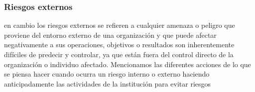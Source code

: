     \subsubsection{Riesgos externos}
     en cambio los riesgos externos se refieren a cualquier amenaza o peligro que proviene del entorno externo de una organización y que puede afectar negativamente a sus operaciones, objetivos o resultados son inherentemente difíciles de predecir y controlar, ya que están fuera del control directo de la organización o individuo afectado.
     Mencionamos las diferentes acciones de lo que se piensa hacer cuando ocurra un riesgo interno o externo haciendo anticipadamente las actividades de la institución para evitar riesgos 
